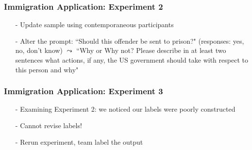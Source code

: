 \documentclass[xcolor=dvipsnames]{beamer}
\begin{document}
\begin{frame}
\frametitle{Immigration Application: Experiment 2}

\begin{itemize}
\item[-] Update sample using contemporaneous participants
\item[-] Alter the prompt: ``Should this offender be sent to prison?" (responses: yes, no, don't know) $\leadsto$ ``Why or Why not? Please describe in at least two sentences what actions, if any, the US government should take with respect to this person and why"  
\end{itemize}	


\end{frame}

\begin{frame}
\frametitle{Immigration Application: Experiment 3}

\begin{itemize}
\item[-] Examining Experiment 2: we noticed our labels were poorly constructed
\item[-] Cannot revise labels!
\item[-] Rerun experiment, team label the output
\end{itemize}	


\end{frame}
\end{document}
